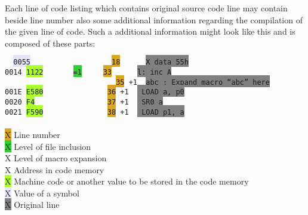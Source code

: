 {                Each line of code listing which contains original source code line may contain beside line number also some additional information regarding the compilation of the given line of code. Such a additional information might look like this and is composed of these parts:

                \begin{code}[h]
                        \verb'  '\texttt{\colorbox{Lavender}{0055}}\verb'                   '\texttt{\colorbox{Goldenrod}{18}}\verb'      '\texttt{\colorbox{Gray}{X      data     55h}} \\
                        \texttt{\colorbox{Apricot}{0014}}\verb' '\texttt{\colorbox{GreenYellow}{1122}}\verb'       '\texttt{\colorbox{LimeGreen}{=1}}\verb'     '\texttt{\colorbox{Goldenrod}{33}}\verb'      '\texttt{\colorbox{Gray}{l:     inc      A}} \\
                        \verb'                          '\texttt{\colorbox{Goldenrod}{35}}\verb' '\texttt{\colorbox{ProcessBlue}{+1}}\verb'  '\texttt{\colorbox{Gray}{abc     ; Expand macro ``abc'' here}} \\
                        \texttt{\colorbox{Apricot}{001E}}\verb' '\texttt{\colorbox{GreenYellow}{E580}}\verb'               '\texttt{\colorbox{Goldenrod}{36}}\verb' '\texttt{\colorbox{ProcessBlue}{+1}}\verb'  '\texttt{\colorbox{Gray}{                LOAD     a, p0}} \\
                        \texttt{\colorbox{Apricot}{0020}}\verb' '\texttt{\colorbox{GreenYellow}{F4}}\verb'                 '\texttt{\colorbox{Goldenrod}{37}}\verb' '\texttt{\colorbox{ProcessBlue}{+1}}\verb'  '\texttt{\colorbox{Gray}{                SR0     a}} \\
                        \texttt{\colorbox{Apricot}{0021}}\verb' '\texttt{\colorbox{GreenYellow}{F590}}\verb'               '\texttt{\colorbox{Goldenrod}{38}}\verb' '\texttt{\colorbox{ProcessBlue}{+1}}\verb'  '\texttt{\colorbox{Gray}{                LOAD     p1, a}} \\\\
                        \colorbox{Goldenrod}{\color{Goldenrod}X} Line number \\
                        \colorbox{LimeGreen}{\color{LimeGreen}X} Level of file inclusion \\
                        \colorbox{ProcessBlue}{\color{ProcessBlue}X} Level of macro expansion \\
                        \colorbox{Apricot}{\color{Apricot}X} Address in code memory \\
                        \colorbox{GreenYellow}{\color{GreenYellow}X} Machine code or another value to be stored in the code memory \\
                        \colorbox{Lavender}{\color{Lavender}X} Value of a symbol \\
                        \colorbox{Gray}{\color{Gray}X} Original line \\


\end{code}}
